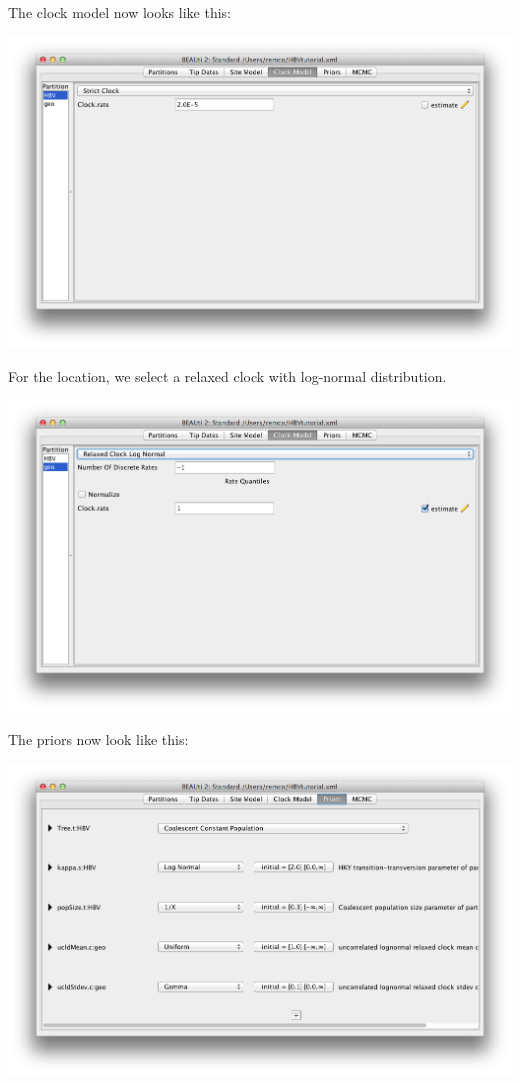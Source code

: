 \documentclass{article}
\begin{document}
The clock model now looks like this:

\includegraphics[scale=0.4,clip=true,trim=0 300 0 0]{figures/BEAUti_clockmodel2.png}

For the location, we select a relaxed clock with log-normal distribution.

\includegraphics[scale=0.4,clip=true,trim=0 300 0 0]{figures/BEAUti_clockmodel3.png}

The priors now look like this:

\includegraphics[scale=0.4]{figures/BEAUti_priors2.png}
\end{document}
